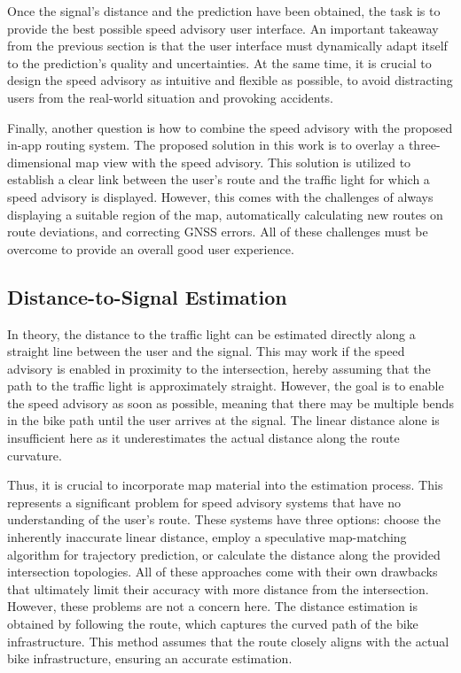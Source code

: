 Once the signal's distance and the prediction have been obtained, the task is to provide the best possible speed advisory user interface. An important takeaway from the previous section is that the user interface must dynamically adapt itself to the prediction's quality and uncertainties. At the same time, it is crucial to design the speed advisory as intuitive and flexible as possible, to avoid distracting users from the real-world situation and provoking accidents.

Finally, another question is how to combine the speed advisory with the proposed in-app routing system. The proposed solution in this work is to overlay a three-dimensional map view with the speed advisory. This solution is utilized to establish a clear link between the user's route and the traffic light for which a speed advisory is displayed. However, this comes with the challenges of always displaying a suitable region of the map, automatically calculating new routes on route deviations, and correcting GNSS errors. All of these challenges must be overcome to provide an overall good user experience.

\subsection{Distance-to-Signal Estimation}

In theory, the distance to the traffic light can be estimated directly along a straight line between the user and the signal. This may work if the speed advisory is enabled in proximity to the intersection, hereby assuming that the path to the traffic light is approximately straight. However, the goal is to enable the speed advisory as soon as possible, meaning that there may be multiple bends in the bike path until the user arrives at the signal. The linear distance alone is insufficient here as it underestimates the actual distance along the route curvature. 

Thus, it is crucial to incorporate map material into the estimation process. This represents a significant problem for speed advisory systems that have no understanding of the user's route. These systems have three options: choose the inherently inaccurate linear distance, employ a speculative map-matching algorithm for trajectory prediction, or calculate the distance along the provided intersection topologies. All of these approaches come with their own drawbacks that ultimately limit their accuracy with more distance from the intersection. However, these problems are not a concern here. The distance estimation is obtained by following the route, which captures the curved path of the bike infrastructure. This method assumes that the route closely aligns with the actual bike infrastructure, ensuring an accurate estimation.


